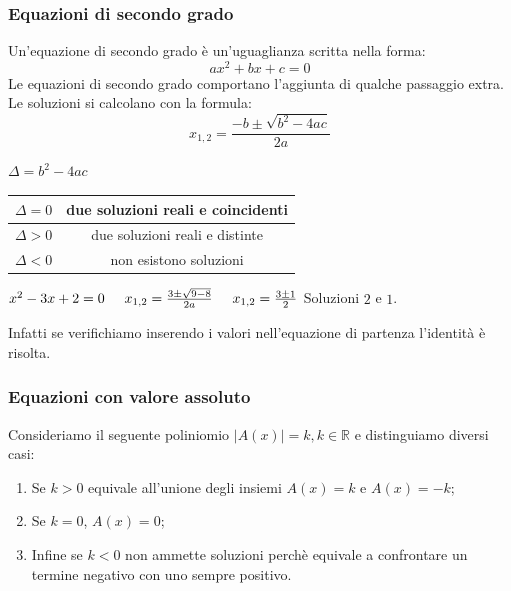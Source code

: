 \subsubsection*{Equazioni di secondo grado}
Un'equazione di secondo grado è un'uguaglianza scritta nella forma:
\begin{equation*}
    ax^2+bx+c=0
\end{equation*}
Le equazioni di secondo grado comportano l'aggiunta di qualche passaggio extra.
Le soluzioni si calcolano con la formula:
\begin{equation}
    x_{1,2}=\frac{-b\pm\sqrt{b^2-4ac}}{2a}
\end{equation}
\begin{center}

    $\Delta =b^2-4ac$\hspace{1cm}
    \begin{tabular}{c|c}
         $\Delta =0$ & due soluzioni reali e coincidenti\\\hline
         $\Delta >0$ & due soluzioni reali e distinte\\\hline
         $\Delta <0$ & non esistono soluzioni
    \end{tabular}
\end{center}
\begin{example}\label{es:eq_2gr}
    $x^2-3x+2=0\hspace{0,5cm}x_{1,2}=\frac{3\pm\sqrt{9-8}}{2a}\hspace{0,5cm}x_{1,2}=\frac{3\pm 1}{2}$\hspace{0,5cm} Soluzioni $2$ e $1$.
    
    Infatti se verifichiamo inserendo i valori nell'equazione di partenza l'identità è risolta.
\end{example}

\subsubsection*{Equazioni con valore assoluto}
Consideriamo il seguente poliniomio $|A(x)|=k, k\in\mathbb{R}$ e distinguiamo diversi casi:
\begin{enumerate}
    \item Se $k>0$ equivale all'unione degli insiemi $A(x)=k$ e $A(x)=-k$;
    \item Se $k=0$, $A(x)=0$;
    \item Infine se $k<0$ non ammette soluzioni perchè equivale a confrontare un termine negativo con uno sempre positivo.
\end{enumerate}

